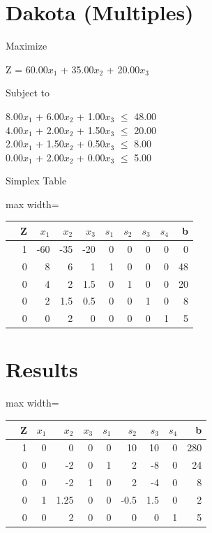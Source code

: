\documentclass[12pt,a4paper]{article}
\begin{document}
\section*{Dakota (Multiples)}
Maximize
\begin{center}
Z = 60.00$x_1$ + 35.00$x_2$ + 20.00$x_3$ 
\end{center}
Subject to
\begin{center}
8.00$x_1$ + 6.00$x_2$ + 1.00$x_3$ $\leq$ 48.00 \\
4.00$x_1$ + 2.00$x_2$ + 1.50$x_3$ $\leq$ 20.00 \\
2.00$x_1$ + 1.50$x_2$ + 0.50$x_3$ $\leq$ 8.00 \\
0.00$x_1$ + 2.00$x_2$ + 0.00$x_3$ $\leq$ 5.00 \\
\end{center}
Simplex Table
\begin{table}[H]
\centering
\begin{adjustbox}{max width=\textwidth}\begin{tabular}{c|rrrrrrrrr}
& Z & $x_1$& $x_2$& $x_3$& $s_1$& $s_2$& $s_3$& $s_4$& b\\ \hline
& 1& -60& -35& -20& 0& 0& 0& 0& 0\\
& 0& 8& 6& 1& 1& 0& 0& 0& 48\\
& 0& 4& 2& 1.5& 0& 1& 0& 0& 20\\
& 0& 2& 1.5& 0.5& 0& 0& 1& 0& 8\\
& 0& 0& 2& 0& 0& 0& 0& 1& 5\\
\end{tabular}
\end{adjustbox}
\end{table}
\section*{Results}
\begin{table}[H]
\centering
\begin{adjustbox}{max width=\textwidth}\begin{tabular}{c|rrrrrrrrr}
& Z & $x_1$& $x_2$& $x_3$& $s_1$& $s_2$& $s_3$& $s_4$& b\\ \hline
& 1& 0& 0& 0& 0& 10& 10& 0& 280\\
& 0& 0& -2& 0& 1& 2& -8& 0& 24\\
& 0& 0& -2& 1& 0& 2& -4& 0& 8\\
& 0& 1& 1.25& 0& 0& -0.5& 1.5& 0& 2\\
& 0& 0& 2& 0& 0& 0& 0& 1& 5\\
\end{tabular}
\end{adjustbox}
\end{table}
\end{document}
